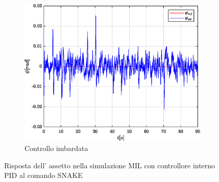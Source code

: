 \begin{figure}
\begin{subfigure}{0.45\textwidth}
		\centering
		\includegraphics[width=1\textwidth]{Simulazioni/Figure/PID/SNAKE_MIL/AttitudeControlYaw}
		\caption{Controllo imbardata}
	\end{subfigure}
	\caption{Risposta dell' assetto nella simulazione MIL con controllore interno PID al comando SNAKE}
\end{figure}


